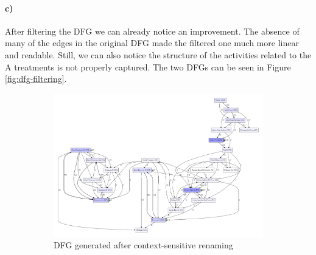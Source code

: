 \documentclass[12pt]{report}
\begin{document}
\paragraph{c)} 

After filtering the DFG we can already notice an improvement. The absence of many of the edges in the original DFG made the filtered one much more linear and readable. Still, we can also notice the structure of the activities related to the A treatments is not properly captured. The two DFGs can be seen in Figure \ref{fig:dfg-filtering}.

\begin{figure}[h]
    \centering
    \begin{subfigure}[b]{0.4\textwidth}
	\centering
	\includegraphics[width=\textwidth]{figures/q1_c_dfg_renaming.pdf}
	\caption{DFG generated after context-sensitive renaming}
	\label{fig:subfigures-q1_c_dfg_renaming-pdf}
    \end{subfigure}
    \hfill
    \begin{subfigure}[b]{0.4\textwidth}
	\centering

\end{subfigure}
\end{figure}
\end{document}
